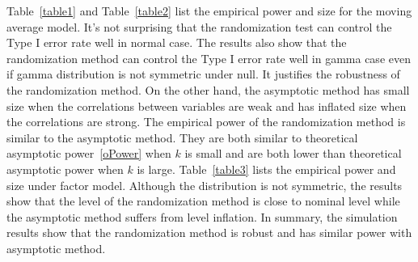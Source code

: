 \documentclass[smallcondensed,final,natbib]{svjour3}          %
\begin{document}
Table~\ref{table1} and Table~\ref{table2} list the empirical power and size for the moving average model.
It's not surprising that the randomization test can  control the Type I error rate well in normal case.
The results also show that the randomization method can control the Type I error rate well in gamma case even if gamma distribution is not symmetric under null.
It justifies the robustness of the randomization method.
On the other hand, the asymptotic method has small size when the correlations between variables are weak and has inflated size when the correlations are strong.
The empirical power of the randomization method is similar to the asymptotic method.
They are both similar to theoretical asymptotic power~\eqref{oPower} when $k$ is small and are both lower than theoretical asymptotic power when $k$ is large.
Table~\ref{table3} lists the empirical power and size under factor model.
Although the distribution is not symmetric, the results show that the level of the randomization method is close to nominal level while the asymptotic method suffers from level inflation.
In summary, the simulation results show that the randomization method is robust and has similar power with asymptotic method.
\end{document}
